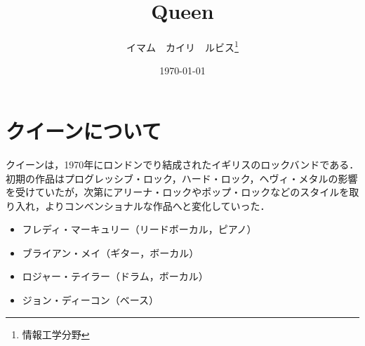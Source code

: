 \documentclass[a4j, twocolumn]{jarticle}
\begin{document}
\title{Queen}
\author{イマム　カイリ　ルビス\thanks{情報工学分野}}
\date{\today}

\maketitle

\section{クイーンについて}
クイーンは，1970年にロンドンでり結成されたイギリスのロックバンドである．初期の作品はプログレッシブ・ロック，ハード・ロック，ヘヴィ・メタルの影響を受けていたが，次第にアリーナ・ロックやポップ・ロックなどのスタイルを取り入れ，よりコンベンショナルな作品へと変化していった．

\vspace{-5pt}

\begin{itemize}
  \item フレディ・マーキュリー（リードボーカル，ピアノ）
  \item ブライアン・メイ（ギター，ボーカル）
  \item ロジャー・テイラー（ドラム，ボーカル）
  \item ジョン・ディーコン（ベース）
\end{itemize}
\end{document}
